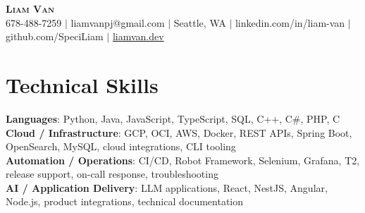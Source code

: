 \documentclass[letterpaper,11pt]{article}
\begin{document}

%
\begin{center}
    \textbf{\Huge \scshape Liam Van} \\ \vspace{1pt}
    \small 678-488-7259 $|$ \small {liamvanpj@gmail.com} $|$ Seattle, WA
 {{$|$ linkedin.com/in/liam-van} {$|$ github.com/SpeciLiam} {$|$ \href{https://liamvan.dev}{liamvan.dev}}}

\end{center}

\section{Technical Skills}
 \begin{itemize}[leftmargin=0.15in, label={}]
    \small{\item{
     \textbf{Languages}{: Python, Java, JavaScript, TypeScript, SQL, C++, C\#, PHP, C} \\
     \textbf{Cloud / Infrastructure}{: GCP, OCI, AWS, Docker, REST APIs, Spring Boot, OpenSearch, MySQL, cloud integrations, CLI tooling} \\
     \textbf{Automation / Operations}{: CI/CD, Robot Framework, Selenium, Grafana, T2, release support, on-call response, troubleshooting} \\
     \textbf{AI / Application Delivery}{: LLM applications, React, NestJS, Angular, Node.js, product integrations, technical documentation} \\
    }}
 \end{itemize}
%
\end{document}
